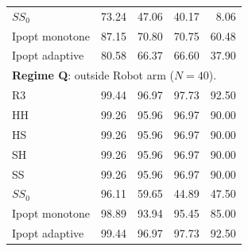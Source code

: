 \documentclass[pdflatex,sn-mathphys-num]{sn-jnl}
\theoremstyle{thmstyleone}
\theoremstyle{thmstylethree}
\newenvironment{scaledtable}[1][tbp]{\begin{tableorg}[#1]\centering}{\end{tableorg}}
\begin{document}
\begin{scaledtable}[!htbp]
{\begin{tabular}{@{}lrrrr@{}}
$SS_0$ & 73.24 & 47.06 & 40.17 & 8.06 \\
Ipopt monotone & 87.15 & 70.80 & 70.75 & 60.48 \\
Ipopt adaptive & 80.58 & 66.37 & 66.60 & 37.90 \\
\midrule
\multicolumn{5}{l}{\textbf{Regime Q}: outside Robot arm ($N=40$).} \\
R3 & 99.44 & 96.97 & 97.73 & 92.50 \\
HH & 99.26 & 95.96 & 96.97 & 90.00 \\
HS & 99.26 & 95.96 & 96.97 & 90.00 \\
SH & 99.26 & 95.96 & 96.97 & 90.00 \\
SS & 99.26 & 95.96 & 96.97 & 90.00 \\
$SS_0$ & 96.11 & 59.65 & 44.89 & 47.50 \\
Ipopt monotone & 98.89 & 93.94 & 95.45 & 85.00 \\
Ipopt adaptive & 99.44 & 96.97 & 97.73 & 92.50 \\
\bottomrule
\end{tabular}

}
\end{scaledtable}
\end{document}
